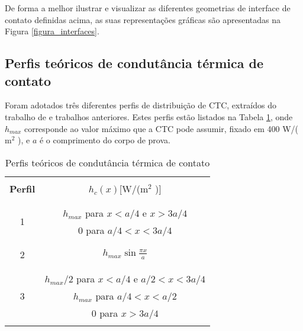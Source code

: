 De forma a melhor ilustrar e visualizar as diferentes geometrias de interface de contato definidas acima, as suas representações gráficas são apresentadas na Figura \ref{figura_interfaces}.



\subsection{Perfis teóricos de condutância térmica de contato}\label{config_ctc}

Foram adotados três diferentes perfis de distribuição de CTC, extraídos do trabalho de \cite{tese_padilha} e trabalhos anteriores. Estes perfis estão listados na Tabela \ref{tabela_ctc}, onde $h_{max}$ corresponde ao valor máximo que a CTC pode assumir, fixado em 400 W/($\text{m}^2$ \celsius), e $a$ é o comprimento do corpo de prova.
\begin{table}[H]
	\centering
	\caption{Perfis teóricos de condutância térmica de contato}
		\begin{tabular}{c|c}
			\hline \\
			\textbf{Perfil} & $h_c(x)$[W/($\text{m}^2$ \celsius)]  \\ \\ \hline \\
			\multirow{2}{*}{1} & $h_{max}$ para $x < a/4$ e $x > 3a/4$ \\ & 0 para $a/4 < x < 3a/4$ \\ \\ \hline \\
			2 & $h_{max}\sin\displaystyle\frac{\pi x}{a}$ \\ \\ \hline \\
			\multirow{3}{*}{3} & $h_{max}/2$ para $x < a/4$ e $a/2 < x < 3a/4$ \\ & $h_{max}$ para $a/4 < x < a/2$ \\ & 0 para $ x > 3a/4$
			\\ \\ \hline
		\end{tabular}			
	\label{tabela_ctc}
\end{table}

